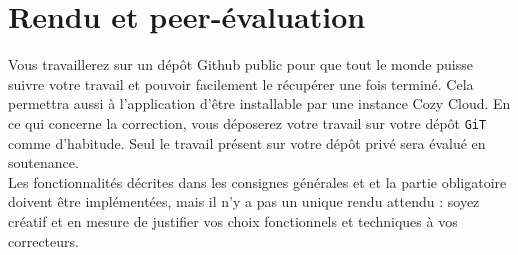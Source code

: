 \documentclass{42-fr}
\begin{document}



\chapter{Rendu et peer-\'evaluation}

	Vous travaillerez sur un d\'ep\^ot Github public pour que tout le monde puisse suivre
	votre travail et pouvoir facilement le récupérer une fois terminé. Cela permettra
	aussi à l'application d'\^etre installable par une instance Cozy Cloud.\newline
	En ce qui concerne la correction, vous d\'eposerez votre travail sur votre d\'ep\^ot 
	\texttt{GiT} comme d'habitude.\newline
	Seul le travail pr\'esent sur votre d\'ep\^ot priv\'e sera \'evalu\'e en soutenance.\\
	Les fonctionnalit\'es d\'ecrites dans les consignes g\'en\'erales et et la partie
	obligatoire doivent \^etre impl\'ementées, mais il n'y a pas un unique rendu attendu :
	soyez cr\'eatif et en mesure de justifier vos choix fonctionnels et techniques à vos 
	correcteurs.



\end{document}
